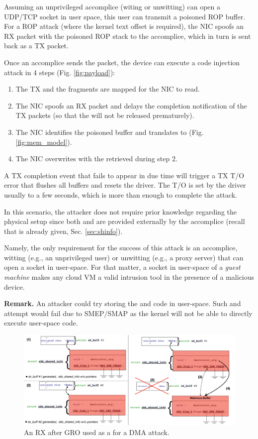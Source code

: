Assuming an unprivileged accomplice (witing or unwitting) can open a UDP/TCP socket in user space, this user can transmit a poisoned ROP buffer. For a ROP attack (where the kernel text offset is required), the NIC spoofs an RX packet with the poisoned ROP stack to the accomplice, which in turn is sent back as a TX packet. 

Once an accomplice sends the packet, the device can execute a code injection attack in 4 steps (Fig. \ref{fig:payload}):
\begin{enumerate}
    \item The TX \data{} and the fragments are mapped for the NIC to read.
    \item The NIC spoofs an RX packet and delays the completion notification of the TX packets (so that the \mabaf{} will not be released prematurely).
    \item The NIC identifies the poisoned buffer and translates \page{} to \kva{} (Fig. \ref{fig:mem_model}).
    \item The NIC overwrites \shinfo{} with the \kva{} retrieved during step 2. 
\end{enumerate}

A TX completion event that fails to appear in due time will trigger a TX T/O error that flushes all buffers and resets the driver. The T/O is set by the driver usually to a few seconds, which is more than enough to complete the attack.
 
In this scenario, the attacker does not require prior knowledge regarding the physical setup since both \means{} and \motivation{} are provided externally by the accomplice (recall that \oportunity{} is already given, Sec. \ref{sec:shinfo}).  

Namely, the only requirement for the success of this attack is an accomplice, witting (e.g., an unprivileged user) or unwitting (e.g., a proxy server) that can open a socket in user-space. For that matter, a socket in user-space of a \emph{guest machine} makes any cloud VM a valid intrusion tool in the presence of a malicious device.

\smallskip
\noindent\textbf{Remark.} An attacker could try storing the \mabaf{} and code in user-space. Such and attempt would fail due to SMEP/SMAP \cite{smep} as the kernel will not be able to directly execute user-space code.

\begin{figure}[t]
    \centering
    \includegraphics[width=\linewidth]{figs/gro.pdf}
    \caption{An RX \skb{} after GRO used as a \means{} for a DMA attack.}
    \label{fig:gro}
\end{figure}

